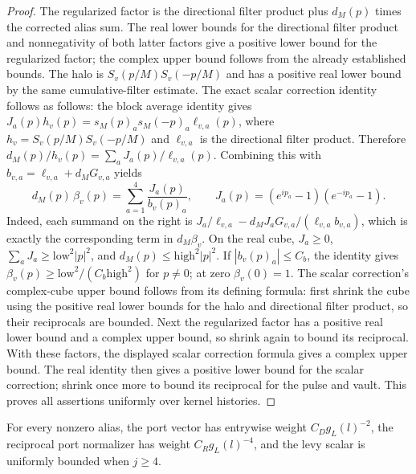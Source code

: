 \begin{proof}
The regularized factor is the directional filter product plus $d_M(p)$ times the corrected alias sum. The real
lower bounds for the directional filter product and nonnegativity of both latter factors give a
positive lower bound for the regularized factor; the complex upper bound follows from
the already established bounds. The halo is
$S_v(p/M)S_v(-p/M)$ and has a positive real lower bound by the same
cumulative-filter estimate. The exact scalar correction identity follows as follows: the block average identity gives
$J_a(p)h_v(p)=s_M(p)_a s_M(-p)_a\ell_{v,a}(p)$, where
$h_v=S_v(p/M)S_v(-p/M)$ and $\ell_{v,a}$ is the directional filter product.
Therefore $d_M(p)/h_v(p)=\sum_aJ_a(p)/\ell_{v,a}(p)$. Combining this
with $b_{v,a}=\ell_{v,a}+d_MG_{v,a}$ yields
\[
 d_M(p)\,\beta_v(p)=\sum_{a=1}^4\frac{J_a(p)}{b_v(p)_a},\qquad
 J_a(p)=(e^{ip_a}-1)(e^{-ip_a}-1).
\]
Indeed, each summand on the right is
$J_a/\ell_{v,a}-d_MJ_aG_{v,a}/(\ell_{v,a}b_{v,a})$, which is exactly
the corresponding term in $d_M\beta_v$. On the real cube, $J_a\geq0$,
$\sum_aJ_a\geq\mathrm{low}^2|p|^2$, and $d_M(p)\leq
\mathrm{high}^2|p|^2$. If $|b_v(p)_a|\leq C_b$, the identity gives
$\beta_v(p)\geq\mathrm{low}^2/(C_b\mathrm{high}^2)$ for $p\ne0$;
at zero $\beta_v(0)=1$. The scalar correction's complex-cube upper bound follows from
its defining formula: first shrink the cube using the positive real lower bounds for the halo and
directional filter product, so their reciprocals are bounded. Next the regularized factor has a positive real
lower bound and a complex upper bound, so shrink again to bound its reciprocal. With these factors, the displayed scalar correction formula gives a complex
upper bound. The real identity then gives a positive lower bound for the
scalar correction; shrink once more to bound its reciprocal for the pulse and vault. This proves all assertions uniformly over kernel histories.
\end{proof}

\begin{lemma}
\label{lem:ex-lattice-port-denominator-weights}
For every nonzero alias, the port vector has entrywise weight
$C_Dg_L(l)^{-2}$, the reciprocal port normalizer has weight
$C_Rg_L(l)^{-4}$, and the levy scalar is uniformly bounded when
$j\geq4$.
\end{lemma}

